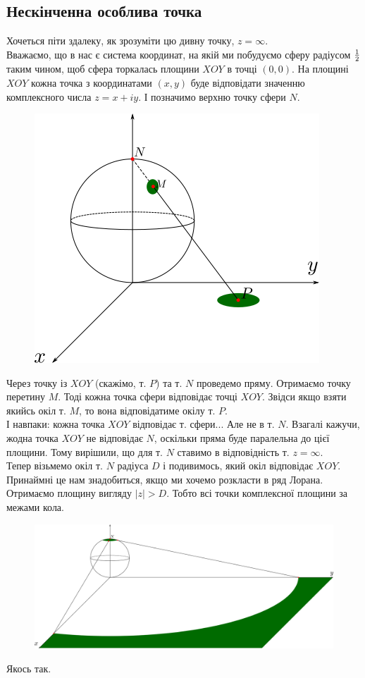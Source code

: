 \documentclass[a4paper, 10pt]{article}
\theoremstyle{theoremdd}
\theoremstyle{theoremdd}
\theoremstyle{theoremdd}
\theoremstyle{theoremdd}
\theoremstyle{theoremdd}
\theoremstyle{theoremdd}
\theoremstyle{theoremdd}
\theoremstyle{theoremdd}
\begin{document}
\subsection{Нескінченна особлива точка}
Хочеться піти здалеку, як зрозуміти цю дивну точку, $z = \infty$.\\
Вважаємо, що в нас є система координат, на якій ми побудуємо сферу радіусом $1\over{2}$ таким чином, щоб сфера торкалась площини $XOY$ в точці $(0,0)$. На площині $XOY$ кожна точка з координатами $(x,y)$ буде відповідати значенню комплексного числа $z = x + iy$. І позначимо верхню точку сфери $N$.
\begin{figure}[H]
\centerline{\includegraphics[scale = 0.7]{Riemann_sphere.png}}
\end{figure}
Через точку із $XOY$ (скажімо, т. $P$) та т. $N$ проведемо пряму. Отримаємо точку перетину $M$. Тоді кожна точка сфери відповідає точці $XOY$. Звідси якщо взяти якийсь окіл т. $M$, то вона відповідатиме окілу т. $P$.\\
І навпаки: кожна точка $XOY$ відповідає т. сфери... Але не в т. $N$. Взагалі кажучи, жодна точка $XOY$ не відповідає $N$, оскільки пряма буде паралельна до цієї площини. Тому вирішили, що для т. $N$ ставимо в відповідність т. $z = \infty$.\\
Тепер візьмемо окіл т. $N$ радіуса $D$ і подивимось, який окіл відповідає $XOY$. Принаймні це нам знадобиться, якщо ми хочемо розкласти в ряд Лорана.\\
Отримаємо площину вигляду $|z|>D$. Тобто всі точки комплексної площини за межами кола.
\begin{figure}[H]
\centerline{\includegraphics[scale = 0.5]{Riemann_sphereINF.png}}
\end{figure}
Якось так.
\end{document}
